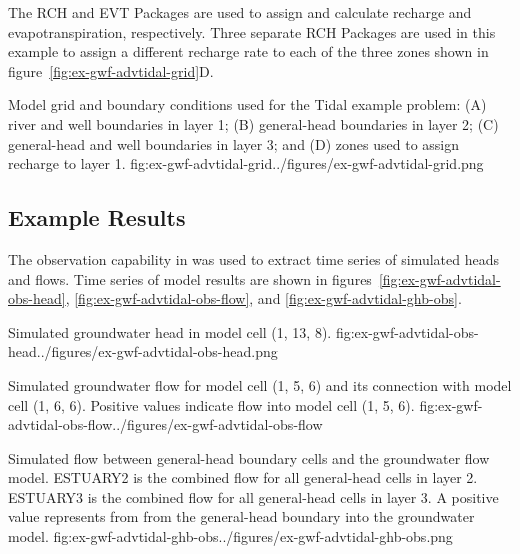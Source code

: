 The RCH and EVT Packages are used to assign and calculate recharge and evapotranspiration, respectively.  Three separate RCH Packages are used in this example to assign a different recharge rate to each of the three zones shown in figure~\ref{fig:ex-gwf-advtidal-grid}D.

\begin{StandardFigure}{
                                     Model grid and boundary conditions used for the Tidal example problem: (A) river and well boundaries in layer 1;  (B) general-head boundaries in layer 2;  (C) general-head and well boundaries in layer 3; and (D) zones used to assign recharge to layer 1.
                                     }{fig:ex-gwf-advtidal-grid}{../figures/ex-gwf-advtidal-grid.png}
\end{StandardFigure}                                 

\subsection{Example Results}

The observation capability in \mf was used to extract time series of simulated heads and flows.  Time series of model results are shown in figures~\ref{fig:ex-gwf-advtidal-obs-head}, \ref{fig:ex-gwf-advtidal-obs-flow}, and \ref{fig:ex-gwf-advtidal-ghb-obs}.  

\begin{StandardFigure}{
                                     Simulated groundwater head in model cell (1, 13, 8).
                                     }{fig:ex-gwf-advtidal-obs-head}{../figures/ex-gwf-advtidal-obs-head.png}
\end{StandardFigure}                                 

\begin{StandardFigure}{
                                     Simulated groundwater flow for model cell (1, 5, 6) and its connection with model cell (1, 6, 6).  Positive values indicate flow into model cell (1, 5, 6).
                                     }{fig:ex-gwf-advtidal-obs-flow}{../figures/ex-gwf-advtidal-obs-flow}
\end{StandardFigure}                                 

\begin{StandardFigure}{
                                     Simulated flow between general-head boundary cells and the groundwater flow model.  ESTUARY2 is the combined flow for all general-head cells in layer 2.  ESTUARY3 is the combined flow for all general-head cells in layer 3.  A positive value represents from from the general-head boundary into the groundwater model.
                                     }{fig:ex-gwf-advtidal-ghb-obs}{../figures/ex-gwf-advtidal-ghb-obs.png}
\end{StandardFigure}                                 
